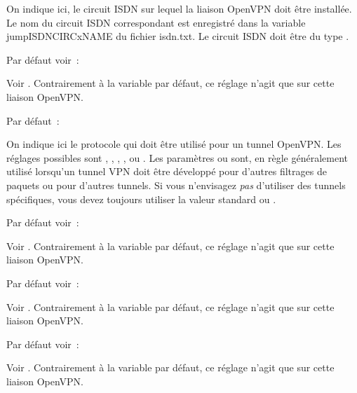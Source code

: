 \begin{description}
  On indique ici, le circuit ISDN sur lequel la liaison OpenVPN doit être installée.
  Le nom du circuit ISDN correspondant est enregistré dans la variable jump{ISDNCIRCxNAME}{}
  du fichier isdn.txt. Le circuit ISDN doit être du type .


  Par défaut voir~: 

  Voir . Contrairement à la
  variable par défaut, ce réglage n'agit que sur cette liaison OpenVPN.


  Par défaut~: 

  On indique ici le protocole qui doit être utilisé pour un tunnel OpenVPN. Les
  réglages possibles sont , , ,
  ,  ou .
  Les paramètres  ou  sont, en règle
  généralement utilisé lorsqu'un tunnel VPN doit être développé pour d'autres
  filtrages de paquets ou pour d'autres tunnels. Si vous n'envisagez \emph{pas}
  d'utiliser des tunnels spécifiques, vous devez toujours utiliser la valeur
  standard  ou .


  Par défaut voir~: 

  Voir .
  Contrairement à la variable par défaut, ce réglage n'agit que sur cette liaison OpenVPN.
  

  Par défaut voir~: 

  Voir .
  Contrairement à la variable par défaut, ce réglage n'agit que sur cette liaison OpenVPN.


  Par défaut voir~: 

  Voir . Contrairement à
  la variable par défaut, ce réglage n'agit que sur cette liaison OpenVPN.


\end{description}
